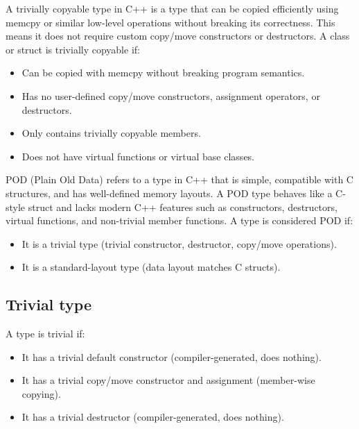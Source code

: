 \documentclass{report}
\begin{document}
    \pagebreak 
    \bigbreak \noindent 
    A trivially copyable type in C++ is a type that can be copied efficiently using memcpy or similar low-level operations without breaking its correctness. This means it does not require custom copy/move constructors or destructors.
    \bigbreak \noindent 
    A class or struct is trivially copyable if:
    \begin{itemize}
        \item Can be copied with memcpy without breaking program semantics.
        \item Has no user-defined copy/move constructors, assignment operators, or destructors.
        \item Only contains trivially copyable members.
        \item Does not have virtual functions or virtual base classes.
    \end{itemize}


    \pagebreak 
    \bigbreak \noindent 
    POD (Plain Old Data) refers to a type in C++ that is simple, compatible with C structures, and has well-defined memory layouts. A POD type behaves like a C-style struct and lacks modern C++ features such as constructors, destructors, virtual functions, and non-trivial member functions.
    \bigbreak \noindent 
    A type is considered POD if:
    \begin{itemize}
        \item It is a trivial type (trivial constructor, destructor, copy/move operations).
        \item It is a standard-layout type (data layout matches C structs).
    \end{itemize}
    \bigbreak \noindent 
    \subsection{Trivial type}
    \bigbreak \noindent 
    A type is trivial if:
    \begin{itemize}
        \item It has a trivial default constructor (compiler-generated, does nothing).
        \item It has a trivial copy/move constructor and assignment (member-wise copying).
        \item It has a trivial destructor (compiler-generated, does nothing).
    \end{itemize}
    \bigbreak \noindent 
\end{document}
